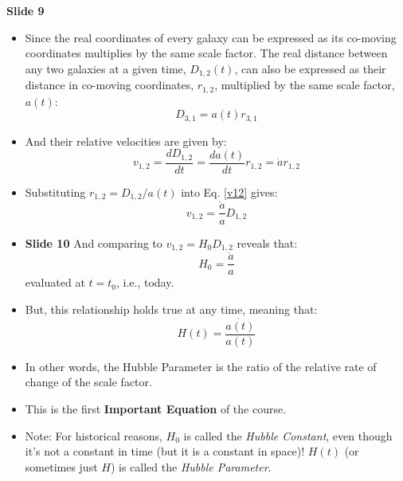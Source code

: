 \documentclass[11pt]{article}
\begin{document}
\vspace{3mm}
\noindent
{\bf Slide 9}
\begin{itemize}
\item Since the real coordinates of every galaxy can be expressed as its co-moving coordinates multiplies by the same scale factor. The real distance between any two galaxies at a given time, $D_{1,2}(t)$, can also be expressed as their distance in co-moving coordinates, $r_{1,2}$,  multiplied by the same scale factor, $a(t)$:
\begin{equation}
D_{3,1} = a(t)r_{3,1}
\end{equation}
\item And their relative velocities are given by:
\begin{equation}
  \label{v12}
  v_{1,2} = \frac{dD_{1,2}}{dt} = \frac{da(t)}{dt}r_{1,2} = \dot{a}r_{1,2}
\end{equation}
\item Substituting $r_{1,2} = D_{1,2}/a(t)$ into Eq. \ref{v12} gives: 
\begin{equation}
  v_{1,2} = \frac{\dot{a}}{a}D_{1,2}
\end{equation}
\item {\bf Slide 10} And comparing to $v_{1,2}=H_0D_{1,2}$ reveals that: 
\begin{equation}
  H_0 = \frac{\dot{a}}{a}
\end{equation}
evaluated at $t=t_0$, i.e., today.
\item But, this relationship holds true at any time, meaning that:
\begin{equation}
  H(t) = \frac{\dot{a(t)}}{a(t)}
\end{equation}
\item In other words, the Hubble Parameter is the ratio of the relative rate of change of the scale factor.
\item This is the first {\bf Important Equation} of the course.
\item Note: For historical reasons, $H_0$ is called the {\it Hubble Constant}, even though it's not a constant in time (but it is a constant in space)! $H(t)$ (or sometimes just $H$) is called the {\it Hubble Parameter}.  
\end{itemize}
\end{document}
